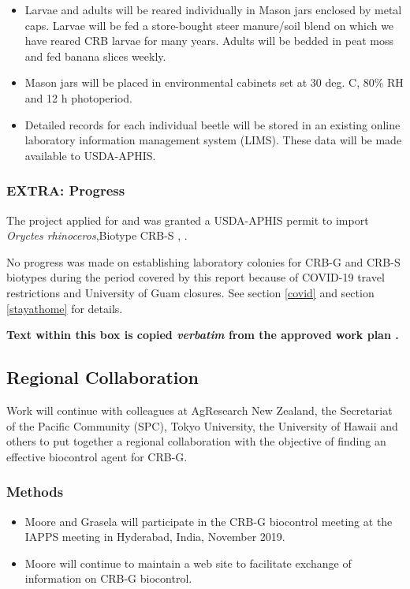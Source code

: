 \documentclass[12pt,letterpaper,english,bibliography=totocnumbered,abstract=on]{scrartcl}
\begin{document}
\begin{framed}
\begin{itemize}
	\item Larvae and adults will be reared individually in Mason jars enclosed by metal caps. Larvae will be fed a store-bought steer manure/soil blend on which we have reared CRB larvae for many years. Adults will be bedded in peat moss and fed banana slices weekly.
	\item Mason jars will be placed in environmental cabinets set at 30 deg. C, 80\% RH and 12 h photoperiod.
	\item Detailed records for each individual beetle will be stored in an existing online laboratory information management system (LIMS). These data will be made available to USDA-APHIS.
\end{itemize}
\end{framed}


\subsubsection{EXTRA: Progress}

The project applied for and was granted a USDA-APHIS permit to import \textit{Oryctes rhinoceros},Biotype CRB-S \cite{usda-aphis_crb_2019}, \cite{moore_additional_2019}.

No progress was made on establishing laboratory colonies for CRB-G and CRB-S biotypes during the period covered by this report because of COVID-19 travel restrictions and University of Guam closures. See section \ref{covid} and section \ref{stayathome} for details.

\newpage\begin{framed}
	
\textbf{Text within this box is copied \emph{verbatim} from the approved work plan \cite{mooreWorkPlanAPHISPPA2020}.} 

\subsection{Regional Collaboration}\label{sec:regional-collaboration}

Work will continue with colleagues at AgResearch New Zealand, the Secretariat of the Pacific Community (SPC), Tokyo University, the University of Hawaii and others to put together a regional collaboration with the objective of finding an effective biocontrol agent for CRB-G.

\subsubsection*{Methods}

\begin{itemize}
	\item Moore and Grasela will participate in the CRB-G biocontrol meeting at the IAPPS meeting in Hyderabad, India, November 2019.
	\item Moore will continue to maintain a web site to facilitate exchange of information on CRB-G biocontrol.
\end{itemize}
\end{framed}
\end{document}
